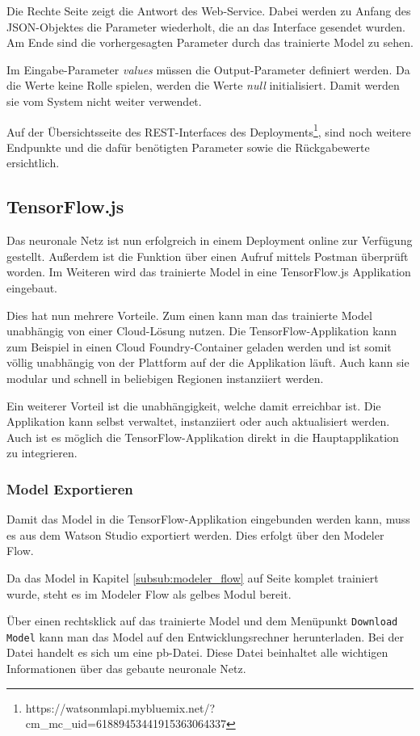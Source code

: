 Die Rechte Seite zeigt die Antwort des Web-Service. Dabei werden zu Anfang des JSON-Objektes die Parameter wiederholt,
die an das Interface gesendet wurden. Am Ende sind die vorhergesagten Parameter durch das trainierte Model zu sehen.

Im Eingabe-Parameter \textit{values} müssen die Output-Parameter definiert werden. Da die Werte keine Rolle spielen,
werden die Werte \textit{null} initialisiert. Damit werden sie vom System nicht weiter verwendet.

Auf der Übersichtsseite des REST-Interfaces des
Deployments\footnote{https://watson\-ml\-api.mybluemix.net/?cm\_mc\_uid=61889453441915363064337}, sind noch weitere
Endpunkte und die dafür benötigten Parameter sowie die Rückgabewerte ersichtlich.

\subsection{TensorFlow.js}
Das neuronale Netz ist nun erfolgreich in einem Deployment online zur Verfügung gestellt. Außerdem ist die Funktion
über einen Aufruf mittels Postman überprüft worden. Im Weiteren wird das trainierte Model in eine TensorFlow.js
Applikation eingebaut.

Dies hat nun mehrere Vorteile. Zum einen kann man das trainierte Model unabhängig von einer Cloud-Lösung nutzen. Die
TensorFlow-Applikation kann zum Beispiel in einen Cloud Foundry-Container geladen werden und ist somit völlig unabhängig
von der Plattform auf der die Applikation läuft. Auch kann sie modular und schnell in beliebigen Regionen instanziiert
werden.

Ein weiterer Vorteil ist die unabhängigkeit, welche damit erreichbar ist. Die Applikation kann selbst verwaltet,
instanziiert oder auch aktualisiert werden. Auch ist es möglich die TensorFlow-Applikation direkt in die Hauptapplikation
zu integrieren.

\subsubsection{Model Exportieren}
Damit das Model in die TensorFlow-Applikation eingebunden werden kann, muss es aus dem Watson Studio exportiert werden.
Dies erfolgt über den Modeler Flow.

Da das Model in Kapitel \ref{subsub:modeler_flow} auf Seite \pageref{subsub:modeler_flow} komplet trainiert wurde, steht
es im Modeler Flow als gelbes Modul bereit.

Über einen rechtsklick auf das trainierte Model und dem Menüpunkt \texttt{Download Model} kann man das Model auf den
Entwicklungsrechner herunterladen. Bei der Datei handelt es sich um eine pb-Datei. Diese Datei beinhaltet alle wichtigen
Informationen über das gebaute neuronale Netz.

